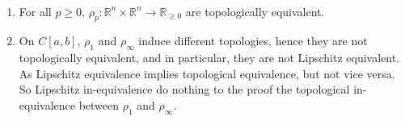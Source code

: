 \begin{note} \ 
	\begin{enumerate}
		\item For all $p \ge 0$, $\rho_p: \mathbb R^n \times \mathbb R^n \to \mathbb R_{\ge 0}$ are topologically equivalent.
		
		\item On $C[a,b]$, $\rho_1$ and $\rho_\infty$ induce different topologies, hence they are not topologically equivalent, and in particular, they are not Lipschitz equivalent. As Lipschitz equivalence implies topological equivalence, but not vice versa. So Lipschitz in-equivalence do nothing to the proof the topological in-equivalence between $\rho_1$ and $\rho_\infty$. 
	\end{enumerate}
\end{note}





































%